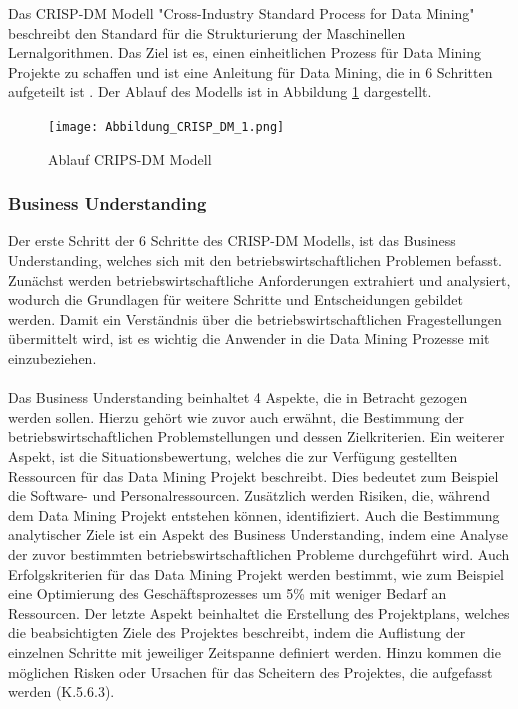 \documentclass[12pt]{scrreprt}
\begin{document}
Das CRISP-DM Modell "Cross-Industry Standard Process for Data Mining" beschreibt den Standard für die Strukturierung der Maschinellen Lernalgorithmen. Das Ziel ist es, einen einheitlichen Prozess für Data Mining Projekte zu schaffen und ist eine Anleitung für Data Mining, die in 6 Schritten aufgeteilt ist \cite{Wuttke}. Der Ablauf des Modells ist in Abbildung \ref{fig:fig6} dargestellt.
	
	\begin{figure}[h!]
		\centering
		\texttt{[image: Abbildung\_CRISP\_DM\_1.png]}
		\caption{Ablauf CRIPS-DM Modell \cite{Abbildung6}}
		\label{fig:fig6}
	\end{figure}
	
	\subsubsection{Business Understanding}
	
	Der erste Schritt der 6 Schritte des CRISP-DM Modells, ist das Business Understanding, welches sich mit den betriebswirtschaftlichen Problemen befasst. Zunächst werden betriebswirtschaftliche Anforderungen extrahiert und analysiert, wodurch die Grundlagen für weitere Schritte und Entscheidungen gebildet werden. Damit ein Verständnis über die betriebswirtschaftlichen Fragestellungen übermittelt wird, ist es wichtig die Anwender in die Data Mining Prozesse mit einzubeziehen.\\
\\
Das Business Understanding beinhaltet 4 Aspekte, die in Betracht gezogen werden sollen. Hierzu gehört wie zuvor auch erwähnt, die Bestimmung der betriebswirtschaftlichen Problemstellungen und dessen Zielkriterien. Ein weiterer Aspekt, ist die Situationsbewertung, welches die zur Verfügung gestellten Ressourcen für das Data Mining Projekt beschreibt. Dies bedeutet zum Beispiel die Software- und Personalressourcen. Zusätzlich werden Risiken, die, während dem Data Mining Projekt entstehen können, identifiziert. Auch die Bestimmung analytischer Ziele ist ein Aspekt des Business Understanding, indem eine Analyse der zuvor bestimmten betriebswirtschaftlichen Probleme durchgeführt wird. Auch Erfolgskriterien für das Data Mining Projekt werden bestimmt, wie zum Beispiel eine Optimierung des Geschäftsprozesses um 5\% mit weniger Bedarf an Ressourcen. Der letzte Aspekt beinhaltet die Erstellung des Projektplans, welches die beabsichtigten Ziele des Projektes beschreibt, indem die Auflistung der einzelnen Schritte mit jeweiliger Zeitspanne definiert werden. Hinzu kommen die möglichen Risken oder Ursachen für das Scheitern des Projektes, die aufgefasst werden \cite{Burkov2019} (K.5.6.3).
	
\end{document}
